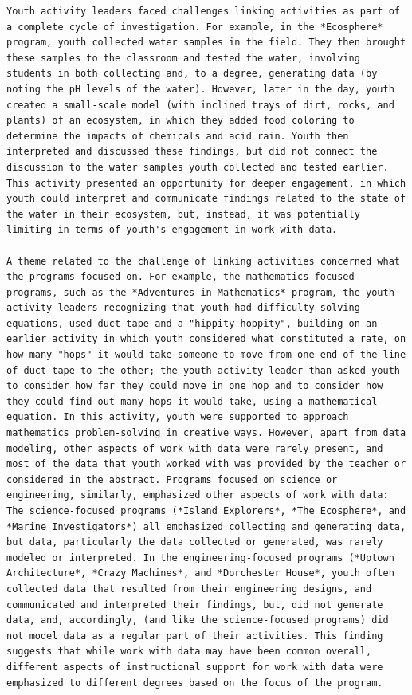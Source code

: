 \documentclass[]{msu-thesis}
\theoremstyle{definition}
\theoremstyle{definition}
\theoremstyle{definition}
\theoremstyle{remark}
\begin{document}
\begin{verbatim}
Youth activity leaders faced challenges linking activities as part of a complete cycle of investigation. For example, in the *Ecosphere* program, youth collected water samples in the field. They then brought these samples to the classroom and tested the water, involving students in both collecting and, to a degree, generating data (by noting the pH levels of the water). However, later in the day, youth created a small-scale model (with inclined trays of dirt, rocks, and plants) of an ecosystem, in which they added food coloring to determine the impacts of chemicals and acid rain. Youth then interpreted and discussed these findings, but did not connect the discussion to the water samples youth collected and tested earlier. This activity presented an opportunity for deeper engagement, in which youth could interpret and communicate findings related to the state of the water in their ecosystem, but, instead, it was potentially limiting in terms of youth's engagement in work with data.

A theme related to the challenge of linking activities concerned what the programs focused on. For example, the mathematics-focused programs, such as the *Adventures in Mathematics* program, the youth activity leaders recognizing that youth had difficulty solving equations, used duct tape and a "hippity hoppity", building on an earlier activity in which youth considered what constituted a rate, on how many "hops" it would take someone to move from one end of the line of duct tape to the other; the youth activity leader than asked youth to consider how far they could move in one hop and to consider how they could find out many hops it would take, using a mathematical equation. In this activity, youth were supported to approach mathematics problem-solving in creative ways. However, apart from data modeling, other aspects of work with data were rarely present, and most of the data that youth worked with was provided by the teacher or considered in the abstract. Programs focused on science or engineering, similarly, emphasized other aspects of work with data: The science-focused programs (*Island Explorers*, *The Ecosphere*, and *Marine Investigators*) all emphasized collecting and generating data, but data, particularly the data collected or generated, was rarely modeled or interpreted. In the engineering-focused programs (*Uptown Architecture*, *Crazy Machines*, and *Dorchester House*, youth often collected data that resulted from their engineering designs, and communicated and interpreted their findings, but, did not generate data, and, accordingly, (and like the science-focused programs) did not model data as a regular part of their activities. This finding suggests that while work with data may have been common overall, different aspects of instructional support for work with data were emphasized to different degrees based on the focus of the program.


\end{verbatim}
\end{document}
